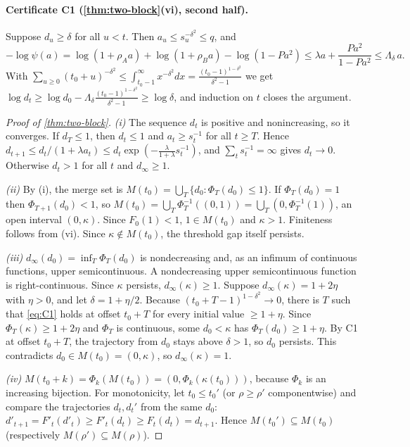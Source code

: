 \paragraph{Certificate C1 (\cref{thm:two-block}(vi), second half).} Suppose $d_u\ge\delta$ for all $u<t$. Then $a_u\le s_u^{-\delta^2}\le q$,
and
\[
-\log\psi(a)=\log(1+\rho_Aa)+\log(1+\rho_Ba)-\log(1-Pa^2)\le\lambda a+\frac{Pa^2}{1-Pa^2}\le\Lambda_\delta\,a .
\]
With $\sum_{u\ge0}(t_0+u)^{-\delta^2}\le\int_{t_0-1}^\infty x^{-\delta^2}dx=\frac{(t_0-1)^{1-\delta^2}}{\delta^2-1}$ we get
$\log d_t\ge\log d_0-\Lambda_\delta\frac{(t_0-1)^{1-\delta^2}}{\delta^2-1}\ge\log\delta$, and induction on $t$ closes the argument.

\begin{proof}[Proof of \cref{thm:two-block}]
\emph{(i)} The sequence $d_t$ is positive and nonincreasing, so it converges. If $d_T\le1$, then $d_t\le1$ and $a_t\ge s_t^{-1}$ for all
$t\ge T$. Hence $d_{t+1}\le d_t/(1+\lambda a_t)\le d_t\exp(-\frac{\lambda}{1+\lambda}s_t^{-1})$, and $\sum_ts_t^{-1}=\infty$ gives $d_t\to0$.
Otherwise $d_t>1$ for all $t$ and $d_\infty\ge1$.

\emph{(ii)} By (i), the merge set is $M(t_0)=\bigcup_T\{d_0:\Phi_T(d_0)\le1\}$. If $\Phi_T(d_0)=1$ then $\Phi_{T+1}(d_0)<1$, so
$M(t_0)=\bigcup_T\Phi_T^{-1}((0,1))=\bigcup_T(0,\Phi_T^{-1}(1))$, an open interval $(0,\kappa)$. Since $F_0(1)<1$, $1\in M(t_0)$ and
$\kappa>1$. Finiteness follows from (vi). Since $\kappa\notin M(t_0)$, the threshold gap itself persists.

\emph{(iii)} $d_\infty(d_0)=\inf_T\Phi_T(d_0)$ is nondecreasing and, as an infimum of continuous functions, upper semicontinuous. A
nondecreasing upper semicontinuous function is right-continuous. Since $\kappa$ persists, $d_\infty(\kappa)\ge1$. Suppose
$d_\infty(\kappa)=1+2\eta$ with $\eta>0$, and let $\delta=1+\eta/2$. Because $(t_0+T-1)^{1-\delta^2}\to0$, there is $T$ such that \eqref{eq:C1}
holds at offset $t_0+T$ for every initial value $\ge1+\eta$. Since $\Phi_T(\kappa)\ge1+2\eta$ and $\Phi_T$ is continuous, some $d_0<\kappa$
has $\Phi_T(d_0)\ge1+\eta$. By C1 at offset $t_0+T$, the trajectory from $d_0$ stays above $\delta>1$, so $d_0$ persists. This contradicts
$d_0\in M(t_0)=(0,\kappa)$, so $d_\infty(\kappa)=1$.

\emph{(iv)} $M(t_0+k)=\Phi_k(M(t_0))=(0,\Phi_k(\kappa(t_0)))$, because $\Phi_k$ is an increasing bijection. For monotonicity, let
$t_0\le t_0'$ (or $\rho\ge\rho'$ componentwise) and compare the trajectories $d_t,d_t'$ from the same $d_0$:
$d'_{t+1}=F'_t(d'_t)\ge F'_t(d_t)\ge F_t(d_t)=d_{t+1}$. Hence $M(t_0')\subseteq M(t_0)$ (respectively $M(\rho')\subseteq M(\rho)$).


\end{proof}
